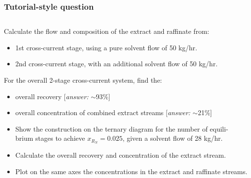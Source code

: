 \begin{frame}\frametitle{Tutorial-style question}
	\begin{exampleblock}{}
		{\color{myBlue}{Consider a system for which you have been given the ternary diagram (see next slides). $A$ = solute, $S$ = solvent (100\% pure), $C$~=~carrier.
		The feed, $F$ enters at 112 kg/hr with composition of 25~wt\% solute and 75 wt\% carrier.	}}
	\end{exampleblock}
	\vspace{-16pt}
	\begin{columns}[t]
			\begin{enumerate}
				{\color{myLightGrey}
				\item	Calculate the flow and composition of the extract and raffinate from:
				\begin{itemize}
					\item	{\color{myLightGrey}1st cross-current stage, using a pure solvent flow of 50 kg/hr.}
					\item	{\color{myLightGrey}2nd cross-current stage, with an additional solvent flow of 50 kg/hr.}
				\end{itemize}
				\item	For the overall 2-stage cross-current system, find the:
				\begin{itemize}
					\item	{\color{myLightGrey}overall recovery {\small \color{myOrange}[\emph{answer:} $\sim$93\%]}}
					\item	{\color{myLightGrey}overall concentration of combined extract streams {\small \color{myOrange}[\emph{answer:} $\sim$21\%]}}
				\end{itemize}}
				\item	{}
				\begin{itemize}
					\item	Show the construction on the ternary diagram for the number of equili- brium stages to achieve $x_{R_N} = 0.025$, given a solvent flow of 28 kg/hr.
					\item	Calculate the overall recovery and concentration of the extract stream.
					\item	Plot on the same axes the concentrations in the extract and raffinate streams.
				\end{itemize}
			\end{enumerate}
	\end{columns}
\end{frame}

